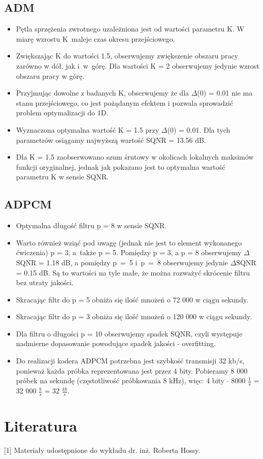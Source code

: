 \documentclass[12pt, a4paper, oneside]{article}
\begin{document}
\subsection{ADM}
\begin{itemize}
\item Pętla sprzężenia zwrotnego uzależniona jest od wartości parametru K. W miarę wzrostu K~maleje czas okresu przejściowego.
\item Zwiększając K do wartości 1.5, obserwujemy zwiększenie obszaru pracy zarówno w dół, jak i~w~górę. Dla wartości K = 2 obserwujemy jedynie wzrost obszaru pracy w górę.
\item Przyjmując dowolne z badanych K, obserwujemy że dla $\Delta$(0) = 0.01 nie ma stanu przejściowego, co jest pożądanym efektem i pozwala sprowadzić problem optymalizacji do 1D.
\item Wyznaczona optymalna wartość K = 1.5 przy $\Delta$(0) = 0.01. Dla tych parametrów osiągamy najwyższą wartość SQNR = 13.56 dB.
\item Dla K = 1.5 zaobserwowano szum śrutowy w okolicach lokalnych maksimów funkcji oryginalnej, jednak jak pokazano jest to optymalna wartość parametru K w sensie SQNR.
\end{itemize}
\subsection{ADPCM}
\begin{itemize}
\item Optymalna długość filtru p = 8 w sensie SQNR.
\item Warto również wziąć pod uwagę (jednak nie jest to element wykonanego ćwiczenia) p = 3, a~także p = 5. Pomiędzy p = 3, a p = 8 obserwujemy $\Delta$SQNR = 1.18 dB, a pomiędzy p~=~5 i~p~=~8 obserwujemy jedynie $\Delta$SQNR = 0.15 dB. Są to wartości na tyle małe, że można rozważyć skrócenie filtru bez utraty jakości.
\item Skracając filtr do p = 5 obniża się ilość mnożeń o 72 000 w ciągu sekundy.
\item Skracając filtr do p = 3 obniża się ilość mnożeń o 120 000 w ciągu sekundy.
\item Dla filtru o długości p = 10 obserwujemy spadek SQNR, czyli występuje nadmierne dopasowanie powodujące spadek jakości - overfitting.
\item Do realizacji kodera ADPCM potrzebna jest szybkość transmisji 32 kb/s, ponieważ każda próbka reprezentowana jest przez 4 bity. Pobieramy 8 000 próbek na sekundę (częstotliwość próbkowania 8 kHz), więc: 4 bity $\cdot$ 8000 $\frac{1}{s}$ = 32 000 $\frac{b}{s}$ = 32 $\frac{kb}{s}$.
\end{itemize}
\clearpage
\section{Literatura}
[1] Materiały udostępnione do wykładu dr. inż. Roberta Hossy.
\end{document}
